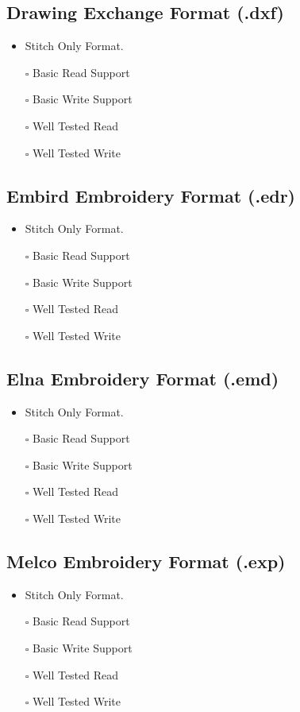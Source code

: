 \documentclass[onesize, a4paper]{refart}
\providecommand{\tightlist}{\setlength{\itemsep}{0pt}\setlength{\parskip}{0pt}}
\begin{document}
\subsection{Drawing Exchange Format (.dxf)}

\begin{itemize}
\tightlist
\item Stitch Only Format.
\item[$\square$] Basic Read Support
\item[$\square$] Basic Write Support
\item[$\square$] Well Tested Read
\item[$\square$] Well Tested Write
\end{itemize}

\subsection{Embird Embroidery Format (.edr)}

\begin{itemize}
\tightlist
\item Stitch Only Format.
\item[$\square$] Basic Read Support
\item[$\square$] Basic Write Support
\item[$\square$] Well Tested Read
\item[$\square$] Well Tested Write
\end{itemize}

\subsection{Elna Embroidery Format (.emd)}

\begin{itemize}
\tightlist
\item Stitch Only Format.
\item[$\square$] Basic Read Support
\item[$\square$] Basic Write Support
\item[$\square$] Well Tested Read
\item[$\square$] Well Tested Write
\end{itemize}

\subsection{Melco Embroidery Format (.exp)}

\begin{itemize}
\tightlist
\item Stitch Only Format.
\item[$\square$] Basic Read Support
\item[$\square$] Basic Write Support
\item[$\square$] Well Tested Read
\item[$\square$] Well Tested Write
\end{itemize}
\end{document}
